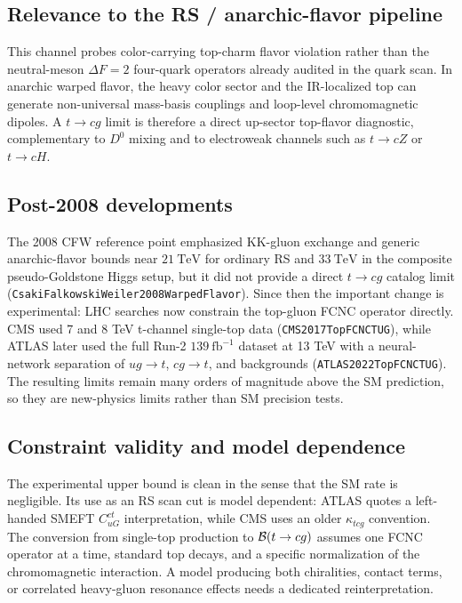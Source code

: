 \subsection*{Relevance to the RS / anarchic-flavor pipeline}
This channel probes color-carrying top-charm flavor violation rather than the
neutral-meson \(\Delta F=2\) four-quark operators already audited in the quark
scan.  In anarchic warped flavor, the heavy color sector and the IR-localized
top can generate non-universal mass-basis couplings and loop-level
chromomagnetic dipoles.  A \(t\to c g\) limit is therefore a direct up-sector
top-flavor diagnostic, complementary to \(D^0\) mixing and to electroweak
channels such as \(t\to cZ\) or \(t\to cH\).

\subsection*{Post-2008 developments}
The 2008 CFW reference point emphasized KK-gluon exchange and generic
anarchic-flavor bounds near \(21~\mathrm{TeV}\) for ordinary RS and
\(33~\mathrm{TeV}\) in the composite pseudo-Goldstone Higgs setup, but it did
not provide a direct \(t\to c g\) catalog limit
(\texttt{CsakiFalkowskiWeiler2008WarpedFlavor}).  Since then the important
change is experimental: LHC searches now constrain the top-gluon FCNC operator
directly.  CMS used 7 and 8 TeV t-channel single-top data
(\texttt{CMS2017TopFCNCTUG}), while ATLAS later used the full Run-2
\(139~\mathrm{fb}^{-1}\) dataset at 13 TeV with a neural-network separation of
\(ug\to t\), \(cg\to t\), and backgrounds
(\texttt{ATLAS2022TopFCNCTUG}).  The resulting limits remain many orders of
magnitude above the SM prediction, so they are new-physics limits rather than
SM precision tests.

\subsection*{Constraint validity and model dependence}
The experimental upper bound is clean in the sense that the SM rate is
negligible.  Its use as an RS scan cut is model dependent: ATLAS quotes a
left-handed SMEFT \(C_{uG}^{ct}\) interpretation, while CMS uses an older
\(\kappa_{tcg}\) convention.  The conversion from single-top production to
\({\cal B}(t\to c g)\) assumes one FCNC operator at a time, standard top
decays, and a specific normalization of the chromomagnetic interaction.  A
model producing both chiralities, contact terms, or correlated heavy-gluon
resonance effects needs a dedicated reinterpretation.


